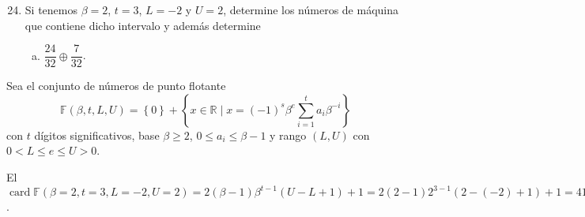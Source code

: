 \begin{frame}
	\begin{enumerate}\setcounter{enumi}{23}
		\item

		      Si tenemos $\beta=2$, $t=3$, $L=-2$ y $U=2$, determine los
		      números de máquina que contiene dicho intervalo y además
		      determine

		      \begin{enumerate}[b)]
			      \item

			            \begin{math}
				            \dfrac{24}{32}\oplus
				            \dfrac{7}{32}
			            \end{math}.
		      \end{enumerate}
	\end{enumerate}

	\begin{solution}
		\begin{definition}
			Sea el \alert{conjunto de números de punto flotante}
			\begin{equation*}
				\mathbb{F}\left(\beta,t,L,U\right)=
				\left\{0\right\}+
				\left\{
				x\in\mathbb{R}\mid
				x=
				\left(-1\right)^{s}
				\beta^{e}
				\sum_{i=1}^{t}a_{i}\beta^{-i}
				\right\}
			\end{equation*}
			con $t$ dígitos significativos, base $\beta\geq2$,
			$0\leq a_{i}\leq\beta-1$ y rango $\left(L,U\right)$ con
			$0<L\leq e\leq U>0$.
		\end{definition}

		El
		\begin{math}
			\operatorname{card}\mathbb{F}\left(\beta=2,t=3,L=-2,U=2\right)=
			2\left(\beta-1\right)\beta^{t-1}\left(U-L+1\right)+1=
			2\left(2-1\right)2^{3-1}\left(2-\left(-2\right)+1\right)+1=
			41
		\end{math}.
	\end{solution}
\end{frame}

